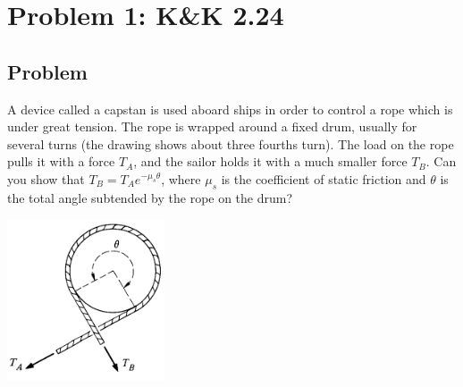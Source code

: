 \documentclass[solutions]{esg8012pset}
\date{September 24}
\begin{document}
\section*{Problem 1: K\&K 2.24}
\subsection*{Problem}
  A device called a capstan is used aboard ships in order to control a rope which is under great tension. The rope is wrapped around a fixed drum, usually for several turns (the drawing shows about three fourths turn). The load on the rope pulls it with a force $T_A$, and the sailor holds it with a much smaller force $T_B$.  Can you show that $T_B = T_Ae^{-\mu_s\theta}$, where $\mu_s$ is the coefficient of static friction and $\theta$ is the total angle subtended by the rope on the drum?
  \begin{center}\includegraphics[width=0.35\textwidth]{ps03_1}\end{center}
\end{document}
